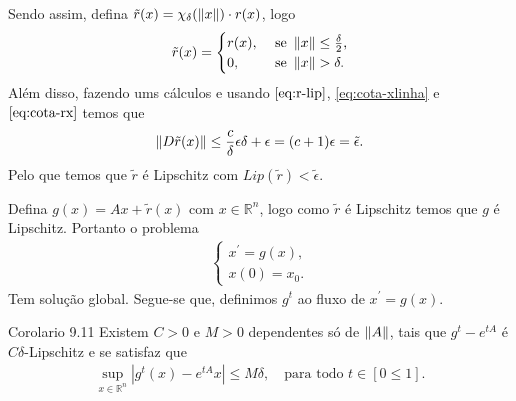 \begin{frame}{}
  \begin{block}{}
    Sendo assim, defina $\tilde{r}(x)=\chi_{\delta}(\left\|x\right\|)\cdot r(x)$, logo
    \begin{align*}
      \tilde{r}(x)=\begin{cases}
        r(x), &\text{ se } \norm{x}\leq \frac{\delta}{2} \text{,} \\
        0, &\text{ se } \norm{x}>\delta.
      \end{cases}
    \end{align*}
    Além disso, fazendo ums cálculos e usando $\eqref{eq:r-lip}$, \eqref{eq:cota-xlinha} e $\eqref{eq:cota-rx}$ temos que
    \begin{align*}
      \left\|D\tilde{r}(x)\right\|\leq \frac{c}{\delta}\epsilon\delta+\epsilon=(c+1)\epsilon=\tilde{\epsilon}.
    \end{align*}
    Pelo que temos que $\tilde{r}$ é Lipschitz com $Lip(\tilde{r})<\tilde{\epsilon}$. 
  \end{block}
\end{frame}

\begin{frame}{}
  \begin{block}{}
    Defina $g(x)=Ax+\tilde{r}(x)$ com $x\in\mathbb{R}^{n}$, logo como $\tilde{r}$ é Lipschitz temos que $g$ é Lipschitz. Portanto o problema
    \begin{align*}
      \begin{cases}
        x^{\prime}=g(x) \text{,} \\
        x(0)=x_0.
      \end{cases}
    \end{align*}
    Tem solução global. Segue-se que, definimos $g^{t}$ ao fluxo de $x^{\prime}=g(x)$.\\
  \end{block}
  \begin{block}{Corolario 9.11}
    Existem $C>0$ e $M>0$ dependentes só de $\left\|A\right\|$, tais que $g^{t}-e^{tA}$ é $C\delta$-Lipschitz e se satisfaz que
    \begin{align*}
      \sup_{x\in\mathbb{R}^{n}}\left| g^{t}(x)-e^{tA}x \right|\leq M\delta,\quad\text{para todo }t\in[0\leq 1].
    \end{align*}
  \end{block} 
\end{frame}

